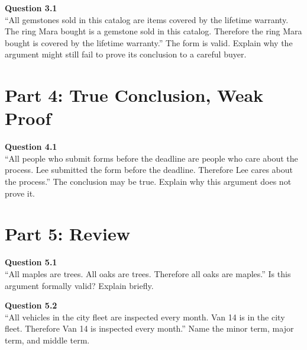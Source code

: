 \documentclass[12pt]{article}
\begin{document}
\textbf{Question 3.1}\\[-0.15em]
``All gemstones sold in this catalog are items covered by the lifetime warranty. The ring Mara bought is a gemstone sold in this catalog. Therefore the ring Mara bought is covered by the lifetime warranty.'' The form is valid. Explain why the argument might still fail to prove its conclusion to a careful buyer.


\newpage

\section*{Part 4: True Conclusion, Weak Proof}

\textbf{Question 4.1}\\[-0.15em]
``All people who submit forms before the deadline are people who care about the process. Lee submitted the form before the deadline. Therefore Lee cares about the process.'' The conclusion may be true. Explain why this argument does not prove it.


\newpage

\section*{Part 5: Review}

\textbf{Question 5.1}\\[-0.15em]
``All maples are trees. All oaks are trees. Therefore all oaks are maples.'' Is this argument formally valid? Explain briefly.


\textbf{Question 5.2}\\[-0.15em]
``All vehicles in the city fleet are inspected every month. Van 14 is in the city fleet. Therefore Van 14 is inspected every month.'' Name the minor term, major term, and middle term.

\end{document}
